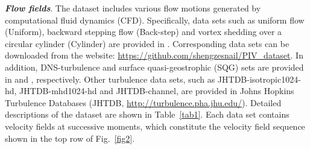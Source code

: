 \documentclass[%
 aip,
 amsmath,amssymb,
 reprint,%
]{revtex4-1}
\begin{document}
\textbf{\textit{Flow fields}}. The dataset includes various flow motions generated by computational fluid dynamics (CFD).
Specifically, data sets such as uniform flow (Uniform), backward stepping flow (Back-step) and vortex shedding over a circular cylinder (Cylinder) are provided in \citet{cai2019particle,cai2019}. Corresponding data sets can be downloaded from the website: \url{https://github.com/shengzesnail/PIV_dataset}.
In addition, DNS-turbulence and surface quasi-geostrophic (SQG) sets are provided in \citet{carlier2005second} and \citet{Resseguier2016}, respectively. 
Other turbulence data sets, such as JHTDB-isotropic1024-hd, JHTDB-mhd1024-hd and JHTDB-channel, are provided in Johns Hopkins Turbulence Databases (JHTDB, \url{http://turbulence.pha.jhu.edu/}).
Detailed descriptions of the dataset are shown in Table~\ref{tab1}. 
Each data set contains velocity fields at successive moments, which constitute the velocity field sequence shown in the top row of Fig.~\ref{fig2}.

\end{document}

